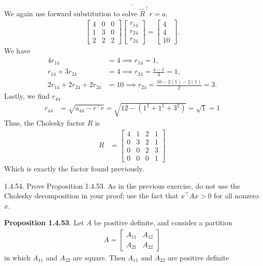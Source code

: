 \documentclass{report}
\begin{document}
\begin{remark}
\begin{align*}
    .\end{align*}
    We again use forward substitution to solve $\hat{R}^{\top} r = a$.
    \begin{align*}
        \begin{bmatrix}
            4 & 0 & 0 \\
            1 & 3 & 0 \\
            2 & 2 & 2
        \end{bmatrix}
        \begin{bmatrix}
            r_{14} \\ r_{24} \\ r_{24} 
        \end{bmatrix}
        = \begin{bmatrix}
            4 \\ 4 \\ 10
        \end{bmatrix}
    .\end{align*}
    We have
    \begin{align*}
        4r_{14} &= 4 \implies r_{14} = 1, \\
        r_{14} + 3r_{24} &= 4 \implies r_{24} = \frac{4-1}{3} = 1, \\
        2r_{14} + 2 r_{24} + 2r_{24} &= 10 \implies r_{24} = \frac{10-2(1)-2(1)}{2} = 3
    .\end{align*}
    Lastly, we find $r_{44}$.
    \begin{align*}
        r_{44} &=\sqrt{a_{44} - r^{\top}r}   = \sqrt{12 - (1^{2} + 1^{2} + 3^{2} )} = \sqrt{1} =1
    \end{align*}
    Thus, the Cholesky factor $R$ is 
    \begin{align*}
            R &= \begin{bmatrix} 4 & 1 & 2 & 1 \\ 0 & 3 & 2 & 1 \\ 0 & 0 & 2 & 3 \\ 0 & 0 & 0 &1 \end{bmatrix} 
    \end{align*}
    Which is exactly the factor found previously.
    



    \pagebreak \bigbreak \noindent 
    \begin{mdframed}
        1.4.54. Prove Proposition 1.4.53. 
        \bigbreak \noindent 
        As in the previous exercise, do not use the Cholesky decomposition in your proof; use the fact that $x^{\top} A x > 0$ for all nonzero $x$.
    \end{mdframed}
    \bigbreak \noindent 
    \textbf{Proposition 1.4.53}. Let $A $ be positive definite, and consider a partition
    \begin{align*}
        A = \begin{bmatrix} A_{11} & A_{12} \\ A_{21} & A_{22} \end{bmatrix}
    \end{align*}
    in which $A_{11} $ and $A_{22} $ are square. Then $A_{11}$ and $A_{22}$ are positive definite


\end{remark}
\end{document}
